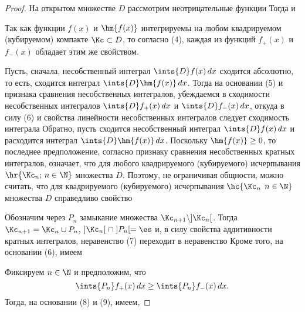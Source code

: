 \documentclass[a4paper]{article}
\begin{document}
\begin{proof}
На открытом множестве $D$ рассмотрим неотрицательные функции
 Тогда  и  

Так как функции $f(x)$ и $\hm{f(x)}$ интегрируемы на любом
квадрируемом (кубируемом) компакте $\Kc\subset D$, то согласно (4),
каждая из функций $f_+(x)$ и $f_-(x)$ обладает этим же свойством.

Пусть, сначала, несобственный интеграл $\ints{D}f(x)\,dx$ сходится
абсолютно, то есть, сходится интеграл $\ints{D}\hm{f(x)}\,dx$. Тогда
на основании (5) и признака сравнения несобственных интегралов,
убеждаемся в сходимости несобственных интегралов
$\ints{D}f_+(x)\,dx$ и $\ints{D}f_-(x)\,dx$, откуда в силу (6) и
свойства линейности несобственных интегралов следует сходимость
интеграла  Обратно, пусть сходится
несобственный интеграл $\ints{D}f(x)\,dx$ и расходится интеграл
$\ints{D}\hm{f(x)}\,dx$. Поскольку $\hm{f(x)}\ge0$, то последнее
предположение, согласно признаку сравнения несобственных кратных
интегралов, означает, что
 для любого
квадрируемого (кубируемого) исчерпывания $\hr{\Kc_n;\,n\in\N}$
множества $D$. Поэтому, не ограничивая общности, можно считать, что
для квадрируемого (кубируемого) исчерпывания $\hc{\Kc_n\;\,n\in\N}$
множества $D$ справедливо свойство 

Обозначим через $P_n$ замыкание множества $\Kc_{n+1}\backslash
]\Kc_n[$. Тогда $\Kc_{n+1}=\Kc_n\cup P_n$, $]\Kc_n[\;\cap\;
]P_n[=\es$ и, в силу свойства аддитивности кратных интегралов,
неравенство (7) переходит в неравенство
 Кроме того, на основании
(6), имеем 

Фиксируем $n\in\N$ и предположим, что $$\ints{P_n}
f_+(x)\,dx\ge\ints{P_n}f_-(x)\,dx.$$ Тогда, на основании (8) и (9),
имеем, 


\end{proof}
\end{document}
